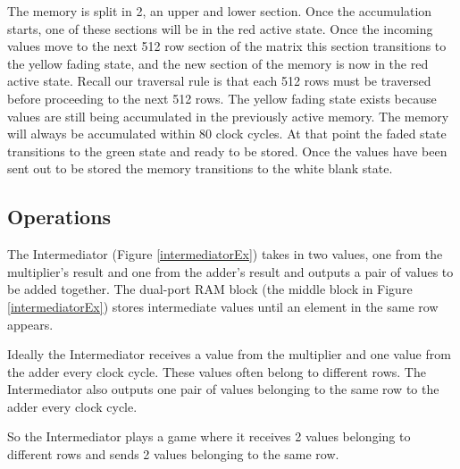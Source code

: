 The memory is split in 2, an upper and lower section. Once the accumulation starts, one of these sections will be in the red active state. Once the incoming values move to the next 512 row section of the matrix this section transitions to the yellow fading state, and the new section of the memory is now in the red active state. Recall our traversal rule is that each 512 rows must be traversed before proceeding to the next 512 rows. The yellow fading state exists because values are still being accumulated in the previously active memory. The memory will always be accumulated within 80 clock cycles. At that point the faded state transitions to the green state and ready to be stored. Once the values have been sent out to be stored the memory transitions to the white blank state.

\subsection{Operations}
The Intermediator (Figure \ref{intermediatorEx}) takes in two values, one from the multiplier's result and one from the adder's result and outputs a pair of values to be added together. The dual-port RAM block (the middle block in Figure \ref{intermediatorEx}) stores intermediate values until an element in the same row appears. \par

Ideally the Intermediator receives a value from the multiplier and one value from the adder every clock cycle. These values often belong to different rows. The Intermediator also outputs one pair of values belonging to the same row to the adder every clock cycle.

\par So the Intermediator plays a game where it receives 2 values belonging to different rows and sends 2 values belonging to the same row.

